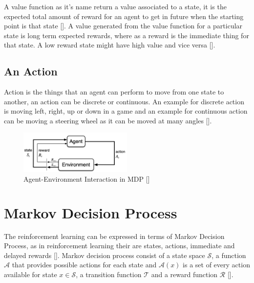 \documentclass[12pt]{article}
\begin{document}
A value function as it's name return a value associated to a state, it is the expected total amount of reward for an agent to get in future when the starting point is that state [\cite{Sutton_Barto_2020}]. A value generated from the value function for a particular state is long term expected rewards, where as a reward is the immediate thing for that state. A low reward state might have high value and vice versa [\cite{Sutton_Barto_2020}].

\subsection{An Action}

Action is the things that an agent can perform to move from one state to another, an action can be discrete or continuous. An example for discrete action is moving left, right, up or down in a game and an example for continuous action can be moving a steering wheel as it can be moved at many angles [\cite{Lapan_2020}].

\begin{figure}[H]
\centering
  \includegraphics[width=0.5\textwidth]{images/agent-env.png}
  \caption{Agent-Environment Interaction in MDP [\cite{Sutton_Barto_2020}]}
  \label{agent-env}
\end{figure}


\section{Markov Decision Process}

The reinforcement learning can be expressed in terms of Markov Decision Process, as in reinforcement learning their are states, actions, immediate and delayed rewards [\cite{Sutton_Barto_2020}]. Markov decision process consist of a state space $\mathcal{S}$, a function $\mathcal{A}$ that provides possible actions for each state and $\mathcal{A}(x)$ is a set of every action available for state $x \in \mathcal{S}$, a transition function $\mathcal{T}$ and a reward function $\mathcal{R}$ [\cite{1989}].
\end{document}
